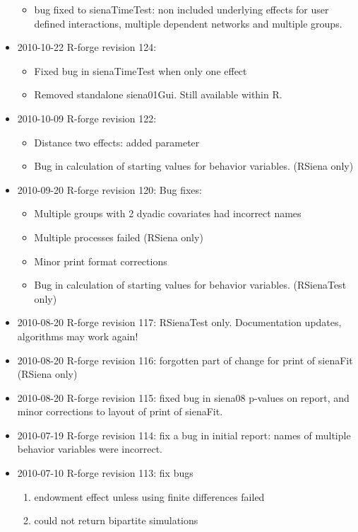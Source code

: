 \documentclass[a4paper,fleqn,11pt]{article}
\newcommand{\+}{\, + \,}
\newcommand{\Rn}{{\sf R}}
\begin{document}
\begin{small}
\begin{itemize}
\begin{itemize}
\item bug fixed to sienaTimeTest: non included underlying effects for user
  defined interactions, multiple dependent networks and multiple groups.
\end{itemize}
\item 2010-10-22 R-forge revision 124:
\begin{itemize}
\item Fixed bug in sienaTimeTest when only one effect
\item Removed standalone siena01Gui. Still available within \Rn.
\end{itemize}
\item 2010-10-09 R-forge revision 122:
\begin{itemize}
\item Distance two effects: added parameter
\item Bug in calculation of starting values for behavior variables.
(RSiena only)
\end{itemize}
\item 2010-09-20 R-forge revision 120: Bug fixes:
\begin{itemize}
\item Multiple groups with 2 dyadic covariates had incorrect names
\item Multiple processes failed (RSiena only)
\item Minor print format corrections
\item Bug in calculation of starting values for behavior variables.
(RSienaTest only)
\end{itemize}
\item 2010-08-20 R-forge revision 117: RSienaTest only. Documentation updates,
algorithms may work again!
\item 2010-08-20 R-forge revision 116: forgotten
part of change for print of sienaFit (RSiena only)
\item 2010-08-20 R-forge revision 115: fixed bug in siena08 p-values on report,
and minor corrections to layout of print of sienaFit.
\item 2010-07-19 R-forge revision 114: fix a bug in initial report: names of
  multiple behavior variables were incorrect.
\item 2010-07-10 R-forge revision 113: fix bugs
\begin{enumerate}
\item endowment effect unless using finite differences failed
\item could not return bipartite simulations
\end{enumerate}

\end{itemize}
\end{small}
\end{document}

